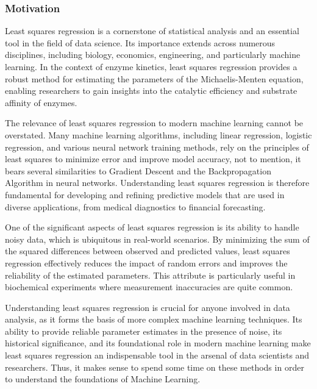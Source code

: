 \documentclass{article} %
\theoremstyle{definition}
\theoremstyle{remark}
\theoremstyle{plain}
\begin{document}
\subsubsection{Motivation}

Least squares regression is a cornerstone of statistical analysis and an essential tool in the field of data science. Its importance extends across numerous disciplines, including biology, economics, engineering, and particularly machine learning. In the context of enzyme kinetics, least squares regression provides a robust method for estimating the parameters of the Michaelis-Menten equation, enabling researchers to gain insights into the catalytic efficiency and substrate affinity of enzymes.

The relevance of least squares regression to modern machine learning cannot be overstated. Many machine learning algorithms, including linear regression, logistic regression, and various neural network training methods, rely on the principles of least squares to minimize error and improve model accuracy, not to mention, it bears several similarities to Gradient Descent and the Backpropagation Algorithm in neural networks. Understanding least squares regression is therefore fundamental for developing and refining predictive models that are used in diverse applications, from medical diagnostics to financial forecasting.

One of the significant aspects of least squares regression is its ability to handle noisy data, which is ubiquitous in real-world scenarios. By minimizing the sum of the squared differences between observed and predicted values, least squares regression effectively reduces the impact of random errors and improves the reliability of the estimated parameters. This attribute is particularly useful in biochemical experiments where measurement inaccuracies are quite common.

Understanding least squares regression is crucial for anyone involved in data analysis, as it forms the basis of more complex machine learning techniques. Its ability to provide reliable parameter estimates in the presence of noise, its historical significance, and its foundational role in modern machine learning make least squares regression an indispensable tool in the arsenal of data scientists and researchers. Thus, it makes sense to spend some time on these methods in order to understand the foundations of Machine Learning.
\end{document}
